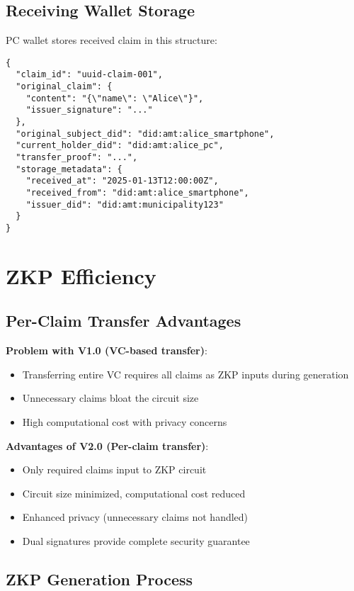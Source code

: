 \subsection{Receiving Wallet Storage}

PC wallet stores received claim in this structure:

\begin{verbatim}
{
  "claim_id": "uuid-claim-001",
  "original_claim": {
    "content": "{\"name\": \"Alice\"}",
    "issuer_signature": "..."
  },
  "original_subject_did": "did:amt:alice_smartphone",
  "current_holder_did": "did:amt:alice_pc",
  "transfer_proof": "...",
  "storage_metadata": {
    "received_at": "2025-01-13T12:00:00Z",
    "received_from": "did:amt:alice_smartphone",
    "issuer_did": "did:amt:municipality123"
  }
}
\end{verbatim}

\section{ZKP Efficiency}

\subsection{Per-Claim Transfer Advantages}

\textbf{Problem with V1.0 (VC-based transfer)}:
\begin{itemize}
  \item Transferring entire VC requires all claims as ZKP inputs during generation
  \item Unnecessary claims bloat the circuit size
  \item High computational cost with privacy concerns
\end{itemize}

\textbf{Advantages of V2.0 (Per-claim transfer)}:
\begin{itemize}
  \item Only required claims input to ZKP circuit
  \item Circuit size minimized, computational cost reduced
  \item Enhanced privacy (unnecessary claims not handled)
  \item Dual signatures provide complete security guarantee
\end{itemize}

\subsection{ZKP Generation Process}


